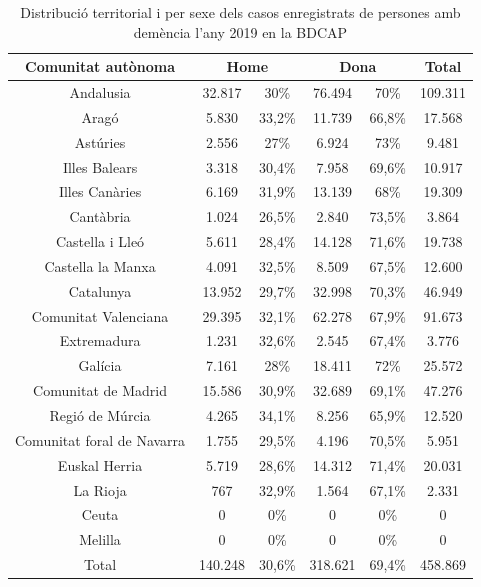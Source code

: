 \documentclass[a4paper,12pt]{article}
\begin{document}
\begin{table}[h]
    \centering
    \begin{tabular}{ |c | c | c | c | c | c | } 
        \hline
        \hline Comunitat autònoma & \multicolumn{2}{|c|}{Home} & \multicolumn{2}{|c|}{Dona} & Total\\
        \hline
        Andalusia & 32.817 & 30\% & 76.494 & 70\% & 109.311\\
        \hline
        Aragó & 5.830 & 33,2\% & 11.739 & 66,8\% & 17.568\\
        \hline
        Astúries & 2.556 & 27\% & 6.924 & 73\% & 9.481\\
        \hline
        Illes Balears & 3.318 & 30,4\% & 7.958 & 69,6\% & 10.917\\
        \hline
        Illes Canàries & 6.169 & 31,9\% & 13.139 & 68\% & 19.309\\
        \hline
        Cantàbria & 1.024 & 26,5\% & 2.840 & 73,5\% & 3.864\\
         \hline
        Castella i Lleó & 5.611 & 28,4\% & 14.128 & 71,6\% & 19.738\\
         \hline
        Castella la Manxa & 4.091 & 32,5\% & 8.509 & 67,5\% & 12.600\\
         \hline
        Catalunya & 13.952 & 29,7\% & 32.998 & 70,3\% & 46.949\\
         \hline
        Comunitat Valenciana & 29.395 & 32,1\% & 62.278 & 67,9\% & 91.673\\
         \hline
        Extremadura & 1.231 & 32,6\% & 2.545 & 67,4\% & 3.776\\
         \hline
        Galícia & 7.161 & 28\% & 18.411 & 72\% & 25.572\\
         \hline
        Comunitat de Madrid & 15.586 & 30,9\% & 32.689 & 69,1\% & 47.276\\
         \hline
        Regió de Múrcia & 4.265 & 34,1\% & 8.256 & 65,9\% & 12.520\\
         \hline
        Comunitat foral de Navarra & 1.755 & 29,5\% & 4.196 & 70,5\% & 5.951\\
         \hline
        Euskal Herria & 5.719 & 28,6\% & 14.312 & 71,4\% & 20.031\\
         \hline
        La Rioja & 767 & 32,9\% & 1.564 & 67,1\% & 2.331\\
         \hline
        Ceuta & 0 & 0\% & 0 & 0\% & 0\\
        \hline
        Melilla & 0 & 0\% & 0 & 0\% & 0\\
        \hline
        Total & 140.248 & 30,6\% & 318.621 & 69,4\% & 458.869\\
        \hline
    \end{tabular}
    \caption{Distribució territorial i per sexe dels casos enregistrats de persones amb demència l'any 2019 en la BDCAP}
    \label{tab:taula2}
\end{table}
\end{document}
